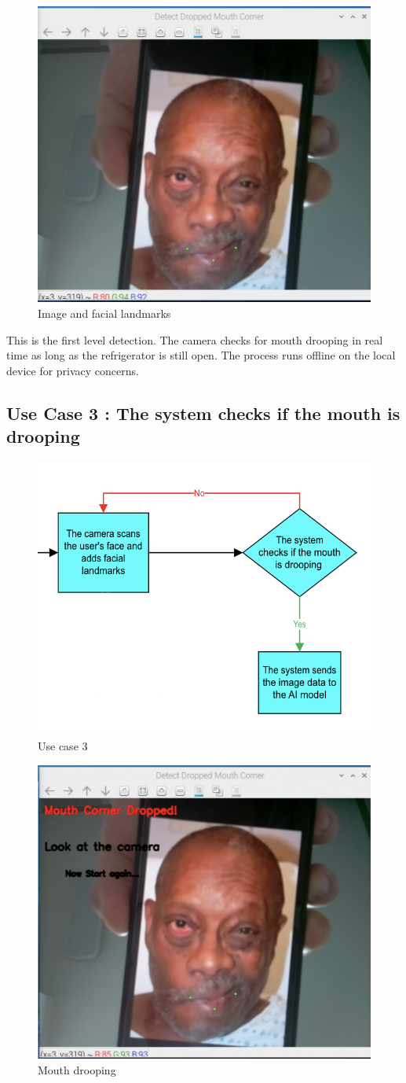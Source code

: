 \begin{figure}[H]
    \centering
    \includegraphics[width=0.5\linewidth]{images/Image.png}
    \caption{Image and facial landmarks}
    \label{fig:image and facial landmarks}
\end{figure}

This is the first level detection. The camera checks for mouth drooping in real time as long as the refrigerator is still open. The process runs offline on the local device for privacy concerns. 

\subsection{\textbf{Use Case 3 : The system checks if the mouth is drooping}}

\begin{figure}[H]
    \centering
    \includegraphics[width=0.7\linewidth]{images/use_case3.png}
    \caption{Use case 3}
    \label{fig:use_case3}
\end{figure}

\begin{figure}[H]
    \centering
    \includegraphics[width=0.5\linewidth]{images/Drooping detected.png}
    \caption{Mouth drooping}
    \label{fig:mouth drooping}
\end{figure}

